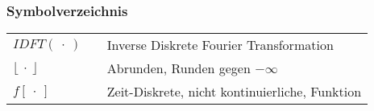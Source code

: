 
\setcounter{page}{1}

\newpage

\thispagestyle{empty}
\clearpage\null
\newpage
\pagestyle{plain}

\setcounter{page}{1}


\newpage

\tableofcontents

\newpage



\listoffigures

\newpage

\listofequations

\newpage

\printacronyms

\newpage

\printglossary[]

\newpage

\subsubsection*{Symbolverzeichnis}

\begin{tabularx}{\linewidth}{l p{2cm} l}
$\textit{IDFT}\left(\ \cdot\ \right)$ && Inverse Diskrete Fourier Transformation \\
$\lfloor\ \cdot\ \rfloor$ && Abrunden, Runden gegen $-\infty$ \\
$f\left[\ \cdot \ \right]$ && Zeit-Diskrete, nicht kontinuierliche, Funktion
\end{tabularx}


